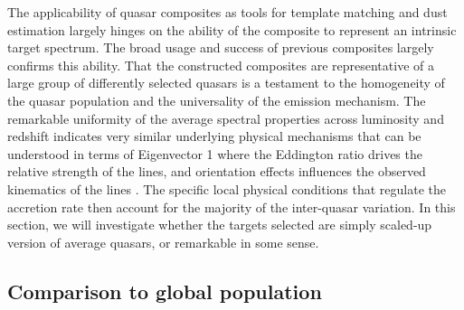 \documentclass{aa}    %
\newcommand{\sectlabel}[1]{\label{sect:#1}}
\begin{document}
The applicability of quasar composites as tools for template matching
and dust estimation largely hinges on the ability of the composite to
represent an intrinsic target spectrum. The broad usage and success of
previous composites largely confirms this ability. That the
constructed composites are representative of a large group of
differently selected quasars is a testament to the homogeneity of the
quasar population and the universality of the emission mechanism.  The
remarkable uniformity of the average spectral properties across
luminosity and redshift indicates very similar underlying physical
mechanisms that can be understood in terms of Eigenvector 1
\citep{Boroson1992, Francis1992} where the Eddington ratio drives the
relative strength of the lines, and orientation effects influences the
observed kinematics of the lines \citep{Shen2014a}. The specific local
physical conditions that regulate the accretion rate then account for
the majority of the inter-quasar variation. In this section, we will
investigate whether the targets selected are simply scaled-up version
of average quasars, or remarkable in some sense.



\subsection{Comparison to global population}  \sectlabel{parents}
\end{document}
